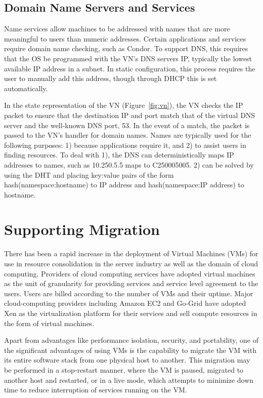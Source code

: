 \subsection{Domain Name Servers and Services}
Name services allow machines to be addressed with names that are more
meaningful to users than numeric addresses.  Certain applications and
services require domain name checking, such as Condor.  To support DNS, this
requires that the OS be programmed with the VN's DNS servers IP, typically
the lowest available IP address in a subnet.  In static configuration, this
process requires the user to manually add this address, though through DHCP
this is set automatically.

In the state representation of the VN (Figure~\ref{fig:vn}), the VN checks the
IP packet to ensure that the destination IP and port match that of the virtual
DNS server and the well-known DNS port, 53.  In the event of a match, the
packet is passed to the VN's handler for domain names.  Names are typically
used for the following purposes: 1) because applications require it, and 2) to
assist users in finding resources.  To deal with 1), the DNS can
deterministically maps IP addresses to names, such as 10.250.5.5 maps to
C250005005.  2) can be solved by using the DHT and placing key:value pairs of
the form hash(namespace:hostname) to IP address and hash(namespace:IP address)
to hostname.

\section{Supporting Migration}
There has been a rapid increase in the deployment of Virtual Machines (VMs) for
use in resource consolidation in the server industry as well as the domain of
cloud computing.  Providers of cloud computing services have adopted virtual
machines as the unit of granularity for providing services and service level
agreement to the users.  Users are billed according to the number of VMs and
their uptime. Major cloud-computing providers including Amazon EC2 and Go-Grid
have adopted Xen as the virtualization platform for their services and sell
compute resources in the form of virtual machines.

Apart from advantages like performance isolation, security, and portability, one
of the significant advantages of using VMs is the capability to migrate the VM
with its entire software stack from one physical host to another.  This
migration may be performed in a stop-restart manner, where the VM is paused,
migrated to another host and restarted, or in a live mode, which attempts to
minimize down time to reduce interruption of services running on the VM.

